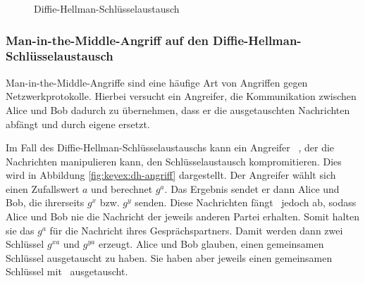 \begin{figure}[h]
  \begin{center}
  \end{center}
  \caption{Diffie-Hellman-Schlüsselaustausch}
  \label{fig:keyex:dh}
\end{figure}
\subsubsection{Man-in-the-Middle-Angriff auf den
  Diffie-Hellman-Schlüsselaustausch}
Man-in-the-Middle-Angriffe sind eine häufige Art von Angriffen gegen
Netzwerkprotokolle. Hierbei versucht ein Angreifer, die Kommunikation
zwischen Alice und Bob dadurch zu übernehmen, dass er die ausgetauschten
Nachrichten abfängt und durch eigene ersetzt.

Im Fall des Diffie-Hellman-Schlüsselaustauschs kann ein Angreifer \A~,
der die Nachrichten manipulieren kann, den Schlüsselaustausch
kompromitieren. Dies wird in Abbildung \ref{fig:keyex:dh-angriff}
dargestellt. Der Angreifer wählt sich einen Zufallswert
$a$ und berechnet $g^a$. Das Ergebnis sendet er dann Alice und Bob, die
ihrerseits $g^x$ bzw. $g^y$ senden. Diese Nachrichten fängt \A~jedoch
ab, sodass Alice und Bob nie die Nachricht der jeweils anderen Partei
erhalten. Somit halten sie das $g^a$ für die Nachricht ihres
Gesprächspartners. Damit werden dann zwei Schlüssel $g^{xa}$ und
$g^{ya}$ erzeugt. Alice und Bob glauben, einen gemeinsamen Schlüssel
ausgetauscht zu haben. Sie haben aber jeweils einen gemeinsamen
Schlüssel mit \A~ausgetauscht.

